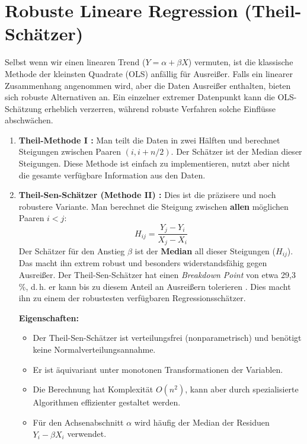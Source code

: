 \documentclass[a4paper, 11pt]{scrartcl}
\begin{document}
\section{Robuste Lineare Regression (Theil-Schätzer)}

Selbst wenn wir einen linearen Trend ($Y = \alpha + \beta X$) vermuten, ist die klassische Methode der kleinsten Quadrate (OLS) anfällig für Ausreißer. Falls ein linearer Zusammenhang angenommen wird, aber die Daten Ausreißer enthalten, bieten sich robuste Alternativen an. Ein einzelner extremer Datenpunkt kann die OLS-Schätzung erheblich verzerren, während robuste Verfahren solche Einflüsse abschwächen.

\begin{enumerate}
	\item \textbf{Theil-Methode I \cite{Theil1950}:} Man teilt die Daten in zwei Hälften und berechnet Steigungen zwischen Paaren $(i, i+n/2)$. Der Schätzer ist der Median dieser Steigungen. Diese Methode ist einfach zu implementieren, nutzt aber nicht die gesamte verfügbare Information aus den Daten.
	
	\item \textbf{Theil-Sen-Schätzer (Methode II) \cite{Theil1950, Sen1968}:} Dies ist die präzisere und noch robustere Variante. Man berechnet die Steigung zwischen \textbf{allen} möglichen Paaren $i < j$:
	      \begin{equation}
	      	H_{ij} = \frac{Y_j - Y_i}{X_j - X_i}
	      \end{equation}
	      Der Schätzer für den Anstieg $\beta$ ist der \textbf{Median} all dieser Steigungen ($H_{ij}$). Das macht ihn extrem robust und besonders widerstandsfähig gegen Ausreißer. Der Theil-Sen-Schätzer hat einen \textit{Breakdown Point} von etwa 29,3\,\%, d.\,h. er kann bis zu diesem Anteil an Ausreißern tolerieren \cite{Sen1968}. Dies macht ihn zu einem der robustesten verfügbaren Regressionsschätzer.
	      
	      \textbf{Eigenschaften:}
	      \begin{itemize}
	      	\item Der Theil-Sen-Schätzer ist verteilungsfrei (nonparametrisch) und benötigt keine Normalverteilungsannahme.
	      	\item Er ist äquivariant unter monotonen Transformationen der Variablen.
	      	\item Die Berechnung hat Komplexität $O(n^2)$, kann aber durch spezialisierte Algorithmen effizienter gestaltet werden.
	      	\item Für den Achsenabschnitt $\alpha$ wird häufig der Median der Residuen $Y_i - \hat{\beta} X_i$ verwendet.
	      \end{itemize}
	      

\end{enumerate}
\end{document}
